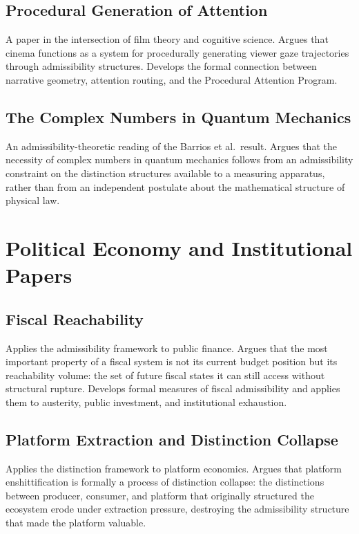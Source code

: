 \documentclass[12pt, openany]{book}
\begin{document}
\subsection{Procedural Generation of Attention} A paper in the intersection
of film theory and cognitive science. Argues that cinema functions as a
system for procedurally generating viewer gaze trajectories through
admissibility structures. Develops the formal connection between narrative
geometry, attention routing, and the Procedural Attention Program.

\subsection{The Complex Numbers in Quantum Mechanics} An admissibility-theoretic
reading of the Barrios et al.\ result. Argues that the necessity of complex
numbers in quantum mechanics follows from an admissibility constraint on
the distinction structures available to a measuring apparatus, rather than
from an independent postulate about the mathematical structure of physical
law.

\section{Political Economy and Institutional Papers}

\subsection{Fiscal Reachability} Applies the admissibility framework to
public finance. Argues that the most important property of a fiscal system
is not its current budget position but its reachability volume: the set
of future fiscal states it can still access without structural rupture.
Develops formal measures of fiscal admissibility and applies them to
austerity, public investment, and institutional exhaustion.

\subsection{Platform Extraction and Distinction Collapse} Applies the
distinction framework to platform economics. Argues that platform
enshittification is formally a process of distinction collapse: the
distinctions between producer, consumer, and platform that originally
structured the ecosystem erode under extraction pressure, destroying
the admissibility structure that made the platform valuable.
\end{document}
